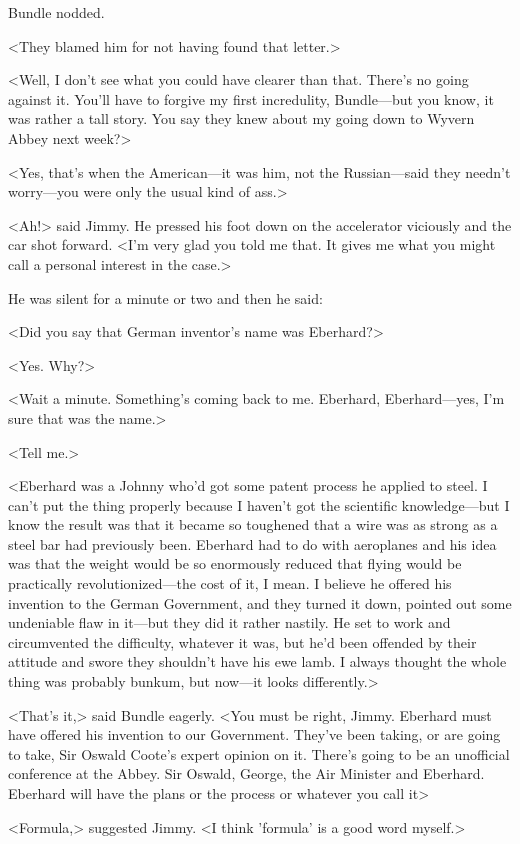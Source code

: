 Bundle nodded.

<They blamed him for not having found that letter.>

<Well, I don't see what you could have clearer than that. There's no going against it. You'll have to forgive my first incredulity, Bundle—but you know, it was rather a tall story. You say they knew about my going down to Wyvern Abbey next week?>

<Yes, that's when the American—it was him, not the Russian—said they needn't worry—you were only the usual kind of ass.>

<Ah!> said Jimmy. He pressed his foot down on the accelerator viciously and the car shot forward. <I'm very glad you told me that. It gives me what you might call a personal interest in the case.>

He was silent for a minute or two and then he said:

<Did you say that German inventor's name was Eberhard?>

<Yes. Why?>

<Wait a minute. Something's coming back to me. Eberhard, Eberhard—yes, I'm sure that was the name.>

<Tell me.>

<Eberhard was a Johnny who'd got some patent process he applied to steel. I can't put the thing properly because I haven't got the scientific knowledge—but I know the result was that it became so toughened that a wire was as strong as a steel bar had previously been. Eberhard had to do with aeroplanes and his idea was that the weight would be so enormously reduced that flying would be practically revolutionized—the cost of it, I mean. I believe he offered his invention to the German Government, and they turned it down, pointed out some undeniable flaw in it—but they did it rather nastily. He set to work and circumvented the difficulty, whatever it was, but he'd been offended by their attitude and swore they shouldn't have his ewe lamb. I always thought the whole thing was probably bunkum, but now—it looks differently.>

<That's it,> said Bundle eagerly. <You must be right, Jimmy. Eberhard must have offered his invention to our Government. They've been taking, or are going to take, Sir Oswald Coote's expert opinion on it. There's going to be an unofficial conference at the Abbey. Sir Oswald, George, the Air Minister and Eberhard. Eberhard will have the plans or the process or whatever you call it\longdash>

<Formula,> suggested Jimmy. <I think 'formula' is a good word myself.>

